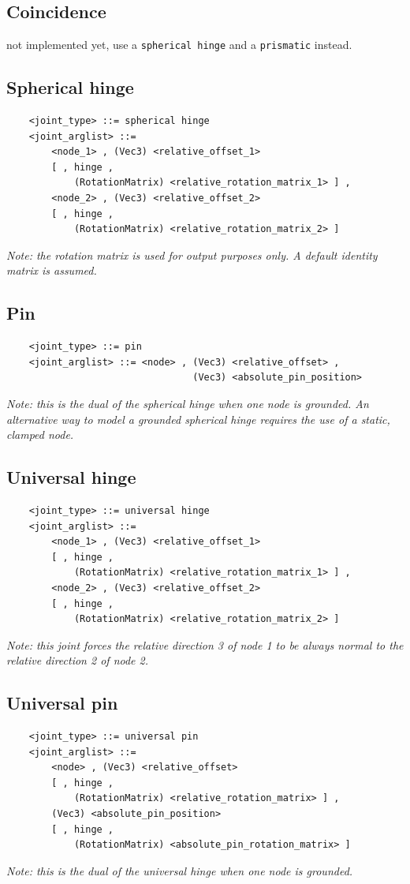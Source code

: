 \subsection{Coincidence}
not implemented yet, use a \texttt{spherical hinge} and a \texttt{prismatic} 
instead.

\subsection{Spherical hinge}
\begin{verbatim}
    <joint_type> ::= spherical hinge
    <joint_arglist> ::= 
        <node_1> , (Vec3) <relative_offset_1> 
        [ , hinge , 
            (RotationMatrix) <relative_rotation_matrix_1> ] ,
        <node_2> , (Vec3) <relative_offset_2>
        [ , hinge , 
            (RotationMatrix) <relative_rotation_matrix_2> ]
\end{verbatim}
{\em
    Note: the rotation matrix is used for output purposes only. 
    A default identity matrix is assumed.
}

\subsection{Pin}
\begin{verbatim}
    <joint_type> ::= pin
    <joint_arglist> ::= <node> , (Vec3) <relative_offset> ,
                                 (Vec3) <absolute_pin_position>
\end{verbatim}
{\em
    Note: this is the dual of the spherical hinge when one node is grounded.
    An alternative way to model a grounded spherical hinge requires the use
    of a static, clamped node.
}

\subsection{Universal hinge}
\begin{verbatim}
    <joint_type> ::= universal hinge
    <joint_arglist> ::= 
        <node_1> , (Vec3) <relative_offset_1> 
        [ , hinge , 
            (RotationMatrix) <relative_rotation_matrix_1> ] ,
        <node_2> , (Vec3) <relative_offset_2>
        [ , hinge , 
            (RotationMatrix) <relative_rotation_matrix_2> ]
\end{verbatim}
{\em
    Note: this joint forces the relative direction 3 of node 1 to be always 
    normal to the relative direction 2 of node 2.
}

\subsection{Universal pin}
\begin{verbatim}
    <joint_type> ::= universal pin
    <joint_arglist> ::= 
        <node> , (Vec3) <relative_offset>
        [ , hinge , 
            (RotationMatrix) <relative_rotation_matrix> ] ,
        (Vec3) <absolute_pin_position>
        [ , hinge , 
            (RotationMatrix) <absolute_pin_rotation_matrix> ]
\end{verbatim}
{\em
    Note: this is the dual of the universal hinge when one node is grounded.
}

